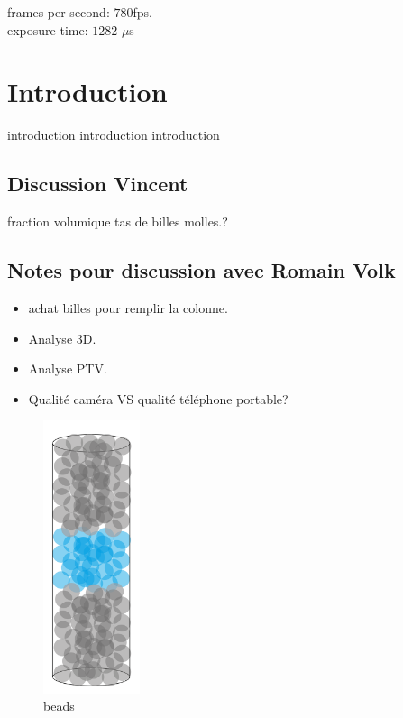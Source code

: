 \documentclass[lineno]{jfm}
\begin{document}
frames per second: $780$fps.\\
exposure time: $1282$  $\mu$s\\




\section{Introduction}
introduction introduction introduction

\subsection{Discussion Vincent}

fraction volumique tas de billes molles.?


\subsection{Notes pour discussion avec Romain Volk}

\begin{itemize}
    \item achat billes pour remplir la colonne.
    \item Analyse 3D.
    \item Analyse PTV.
    \item Qualité caméra VS qualité téléphone portable?
\end{itemize}


\begin{figure}
  \centerline{\includegraphics[height=8cm]{figures/beadsStack.png}} %
  \caption{beads}
  \label{fig:beads}
\end{figure}
\end{document}
